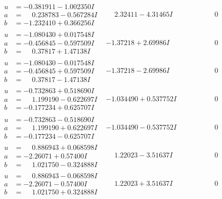 \documentclass[1p]{elsarticle_modified}
\theoremstyle{definition}
\begin{document}
$$\begin{array}{c|c|c}
\begin{aligned}
u &= -0.381911 - 1.002350 I \\
a &= \phantom{-}0.238783 - 0.567284 I \\
b &= -1.232410 + 0.366256 I\end{aligned}
 & \phantom{-}2.32411 - 4.31465 I & \phantom{-0.000000 } 0 \\ \hline\begin{aligned}
u &= -1.080430 + 0.017548 I \\
a &= -0.456845 - 0.597509 I \\
b &= \phantom{-}0.37817 + 1.47138 I\end{aligned}
 & -1.37218 + 2.69986 I & \phantom{-0.000000 } 0 \\ \hline\begin{aligned}
u &= -1.080430 - 0.017548 I \\
a &= -0.456845 + 0.597509 I \\
b &= \phantom{-}0.37817 - 1.47138 I\end{aligned}
 & -1.37218 - 2.69986 I & \phantom{-0.000000 } 0 \\ \hline\begin{aligned}
u &= -0.732863 + 0.518690 I \\
a &= \phantom{-}1.199190 - 0.622697 I \\
b &= -0.177234 + 0.625707 I\end{aligned}
 & -1.034490 + 0.537752 I & \phantom{-0.000000 } 0 \\ \hline\begin{aligned}
u &= -0.732863 - 0.518690 I \\
a &= \phantom{-}1.199190 + 0.622697 I \\
b &= -0.177234 - 0.625707 I\end{aligned}
 & -1.034490 - 0.537752 I & \phantom{-0.000000 } 0 \\ \hline\begin{aligned}
u &= \phantom{-}0.886943 + 0.068598 I \\
a &= -2.26071 + 0.57400 I \\
b &= \phantom{-}1.021750 - 0.324888 I\end{aligned}
 & \phantom{-}1.22023 - 3.51637 I & \phantom{-0.000000 } 0 \\ \hline\begin{aligned}
u &= \phantom{-}0.886943 - 0.068598 I \\
a &= -2.26071 - 0.57400 I \\
b &= \phantom{-}1.021750 + 0.324888 I\end{aligned}
 & \phantom{-}1.22023 + 3.51637 I & \phantom{-0.000000 } 0 \\ \hline\begin{aligned}

\end{aligned}
\end{array}$$
\end{document}
